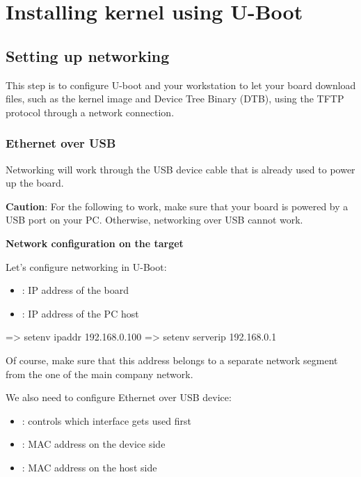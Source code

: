 
\section{Installing kernel using U-Boot}

\subsection{Setting up networking}

This step is to configure U-boot and your workstation to let your
board download files, such as the kernel image and Device Tree Binary
(DTB), using the TFTP protocol through a network connection.

\subsubsection{Ethernet over USB}

Networking will work through the USB device
cable that is already used to power up the board.

{\bf Caution}: For the following to work, make sure that your board
is powered by a USB port on your PC. Otherwise, networking over USB
cannot work.

{\bf Network configuration on the target}

Let's configure networking in U-Boot:

\begin{itemize}
  \item {}: IP address of the board
  \item {}: IP address of the PC host
\end{itemize}

\begin{ubootinput}
=> setenv ipaddr 192.168.0.100
=> setenv serverip 192.168.0.1
\end{ubootinput}

Of course, make sure that this address belongs to a separate network
segment from the one of the main company network.

We also need to configure Ethernet over USB device:
\begin{itemize}
  \item {}: controls which interface gets used first
  \item {}: MAC address on the device side
  \item {}: MAC address on the host side
\end{itemize}

